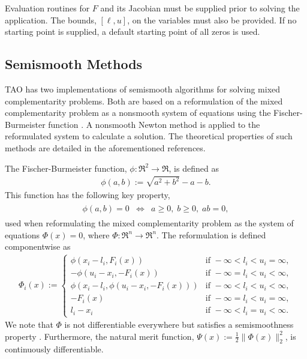 Evaluation routines for $F$ and its Jacobian must be supplied prior
to solving the application.
The bounds, $[\ell,u]$, on the variables must also be 
provided.  
If no starting point is supplied, a default starting point of all zeros 
is used.

\subsection{Semismooth Methods}

TAO has two implementations of semismooth algorithms 
\cite{munson.facchinei.ea:semismooth, deluca.facchinei.ea:semismooth, 
facchinei.fischer.ea:semismooth} for solving mixed complementarity problems.
Both are based on a reformulation of the mixed complementarity problem
as a nonsmooth system of equations using the Fischer-Burmeister 
function \cite{fischer:special}.  A nonsmooth Newton method is applied to
the reformulated system to calculate a solution.  The theoretical properties
of such methods are detailed in the aforementioned references.

The Fischer-Burmeister function, $\phi:\Re^2 \to \Re$, is defined as
\begin{eqnarray*}
\phi(a,b) := \sqrt{a^2 + b^2} - a - b.
\end{eqnarray*}
This function has the following key property,
\begin{eqnarray*}
\begin{array}{lcr}
        \phi(a,b) = 0 & \Leftrightarrow & a \geq 0,\; b \geq 0,\; ab = 0,
\end{array}
\end{eqnarray*}
used when reformulating the mixed complementarity problem as the system of 
equations $\Phi(x) = 0$, where $\Phi:\Re^n \to \Re^n$.  
The reformulation is defined componentwise as
\begin{eqnarray*}
\Phi_i(x) := \left\{ \begin{array}{ll}
   \phi(x_i - l_i, F_i(x)) & \mbox{if } -\infty < l_i < u_i = \infty, \\
   -\phi(u_i-x_i, -F_i(x)) & \mbox{if } -\infty = l_i < u_i < \infty, \\
   \phi(x_i - l_i, \phi(u_i - x_i, - F_i(x))) & \mbox{if } -\infty < l_i < u_i < \infty, \\
   -F_i(x) & \mbox{if } -\infty = l_i < u_i = \infty, \\
   l_i - x_i & \mbox{if } -\infty < l_i = u_i < \infty.
   \end{array} \right.
\end{eqnarray*}
We note that $\Phi$ is not differentiable everywhere but satisfies a
semismoothness property 
\cite{mifflin:semismooth, qi:convergence, qi.sun:nonsmooth}.  Furthermore,
the natural merit function, $\Psi(x) := \frac{1}{2} \| \Phi(x) \|_2^2$, is 
continuously differentiable.

